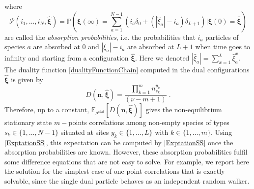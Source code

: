 \documentclass[10pt]{article}
\numberwithin{equation}{section}
\numberwithin{equation}{subsection}
\newcommand{\dt}{\;.}
\begin{document}
where 
\begin{equation}\label{Pass}
	\mathcal{P}(i_{1},\ldots,i_{N},\hat{\bm{\xi}})	=\mathbb{P}\left(\bm{\xi}(\infty)=\sum_{a=1}^{N-1}\left(i_{a}\delta_{0}+(|\hat{\xi}_{a}|-i_{a})\delta_{L+1}\right)| \bm{\xi}(0)=\hat{\bm{\xi}}\right)
\end{equation}
are called the \textit{absorption probabilities}, i.e. the probabilities that $i_{a}$ particles of species $a$ are absorbed at $0$ and $|\xi_{a}|-i_{a}$ are absorbed at $L+1$ when time goes to infinity and starting from a configuration $\hat{\bm{\xi}}$. Here we denoted $|\hat{\xi}_{a}|=\sum_{x=1}^{L}\hat{\xi}_{a}^{x}$.
The duality function \eqref{dualityFunctionChain} computed in the dual configurations $\bm{\hat{\xi}}$ is given by 
\begin{equation}
	D(\bm{n},\bm{\hat{\xi}})= \frac{\prod_{k=1}^{m}n_{s_{k}}^{y_{k}}}{(\nu-m+1)}\dt
\end{equation}
Therefore, up to a constant, $\mathbb{E}_{\mu^{\text{stat}}}\left[D(\bm{n},\bm{\hat{\xi}})\right]$ gives the non-equilibrium stationary state $m-$points correlations among non-empty species of types $s_{k}\in\{1,\ldots,N-1\}$ situated at sites $y_{k}\in\{1,\ldots,L\}$ with $k\in \{1,\ldots,m\}$. Using \eqref{ExptationSS}, this expectation can be computed by \eqref{ExptationSS} once the absorption probabilities are known. However, these absorption probabilities fulfil some difference equations that are not easy to solve. For example, we report here the solution for the simplest case of one point correlations that is exactly solvable, since the single dual particle behaves as an independent random walker. 
\end{document}
